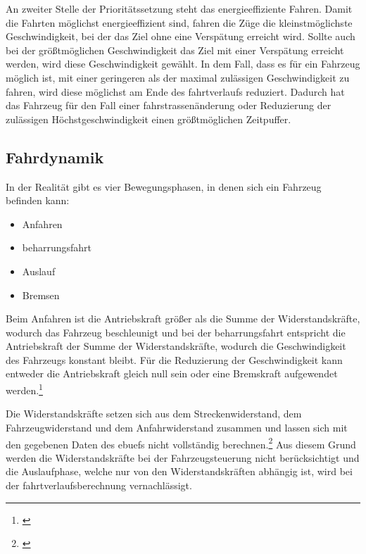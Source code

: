 An zweiter Stelle der Prioritätssetzung steht das energieeffiziente Fahren. Damit die Fahrten möglichst energieeffizient sind, fahren die Züge die kleinstmöglichste Geschwindigkeit, bei der das Ziel ohne eine Verspätung erreicht wird. Sollte auch bei der größtmöglichen Geschwindigkeit das Ziel mit einer Verspätung erreicht werden, wird diese Geschwindigkeit gewählt. In dem Fall, dass es für ein Fahrzeug möglich ist, mit einer geringeren als der maximal zulässigen Geschwindigkeit zu fahren, wird diese möglichst am Ende des \gls{fahrtverlauf}s reduziert. Dadurch hat das Fahrzeug für den Fall einer \gls{fahrstrasse}nänderung oder Reduzierung der zulässigen Höchstgeschwindigkeit einen größtmöglichen Zeitpuffer.
\subsection{Fahrdynamik}
In der Realität gibt es vier Bewegungsphasen, in denen sich ein Fahrzeug befinden kann:
\begin{itemize}
\item Anfahren
\item \Gls{beharrungsfahrt}
\item Auslauf
\item Bremsen
\end{itemize}
Beim Anfahren ist die Antriebskraft größer als die Summe der Widerstandskräfte, wodurch das Fahrzeug beschleunigt und bei der \Gls{beharrungsfahrt} entspricht die Antriebskraft der Summe der Widerstandskräfte, wodurch die Geschwindigkeit des Fahrzeugs konstant bleibt. Für die Reduzierung der Geschwindigkeit kann entweder die Antriebskraft gleich null sein oder eine Bremskraft aufgewendet werden.\footnote{\citet[S. 23 ff.]{pachl1999systemtechnik}}

Die Widerstandskräfte setzen sich aus dem Streckenwiderstand, dem Fahrzeugwiderstand und dem Anfahrwiderstand zusammen und lassen sich mit den gegebenen Daten des \ac{ebuef}s nicht vollständig berechnen.\footnote{\citet[S. 25 ff.]{pachl1999systemtechnik}} Aus diesem Grund werden die Widerstandskräfte bei der Fahrzeugsteuerung nicht berücksichtigt und die Auslaufphase, welche nur von den Widerstandskräften abhängig ist, wird bei der \Gls{fahrtverlauf}sberechnung vernachlässigt.
